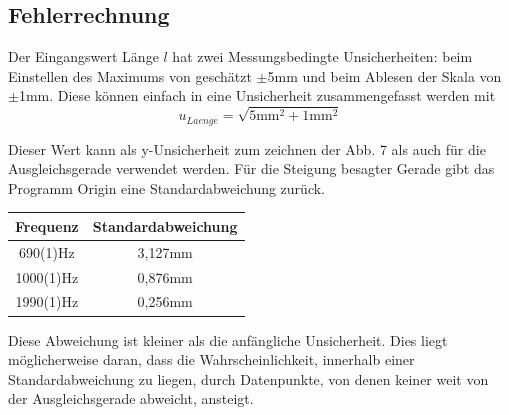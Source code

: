 \documentclass{article}
\begin{document}
\subsection{Fehlerrechnung}

Der Eingangswert Länge $l$ hat zwei Messungsbedingte Unsicherheiten: beim Einstellen des Maximums von geschätzt $\pm$5mm und beim Ablesen der Skala von $\pm$1mm. Diese können einfach in eine Unsicherheit zusammengefasst werden mit
\begin{equation}
u_{Laenge} = \sqrt{5\textrm{mm}^2 + 1\textrm{mm}^2}
\end{equation}

Dieser Wert kann als y-Unsicherheit zum zeichnen der Abb. 7 als auch für die Ausgleichsgerade verwendet werden. Für die Steigung besagter Gerade gibt das Programm Origin eine Standardabweichung zurück. 

\begin{center}
\begin{tabular}{|c|c|}
\hline 
Frequenz & Standardabweichung \\ 
\hline 
690(1)Hz & 3,127mm \\ 
\hline 
1000(1)Hz & 0,876mm \\ 
\hline 
1990(1)Hz & 0,256mm \\ 
\hline 
\end{tabular} 
\end{center}

Diese Abweichung ist kleiner als die anfängliche Unsicherheit. Dies liegt möglicherweise daran, dass die Wahrscheinlichkeit, innerhalb einer Standardabweichung zu liegen, durch Datenpunkte, von denen keiner weit von der Ausgleichsgerade abweicht, ansteigt.
\end{document}
